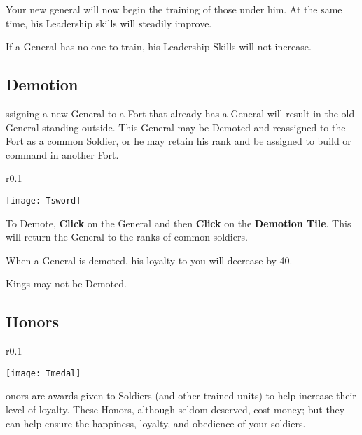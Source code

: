 Your new general will now begin the training of those under him. At the same time, his Leadership skills will steadily improve.

If a General has no one to train, his Leadership Skills will not increase.

\subsection{Demotion}


ssigning a new General to a Fort that already has a General will result in the old General standing outside. This General may be Demoted and reassigned to the Fort as a common Soldier, or he may retain his rank and be assigned to build or command in another Fort.

\begin{wrapfigure}{r}{0.1\textwidth}
    \vspace{-20pt}
    \begin{center}
        \texttt{[image: Tsword]}
    \end{center}
    \vspace{-20pt}
\end{wrapfigure}

To Demote, \textbf{Click} on the General and then \textbf{Click} on the \textbf{Demotion Tile}. This will return the General to the ranks of common soldiers.

When a General is demoted, his loyalty to you will decrease by 40.

Kings may not be Demoted.

\subsection{Honors}


\begin{wrapfigure}{r}{0.1\textwidth}
    \vspace{-20pt}
    \begin{center}
        \texttt{[image: Tmedal]}
    \end{center}
    \vspace{-20pt}
\end{wrapfigure}

onors are awards given to Soldiers (and other trained units) to help increase their level of loyalty. These Honors, although seldom deserved, cost money; but they can help ensure the happiness, loyalty, and obedience of your soldiers.

